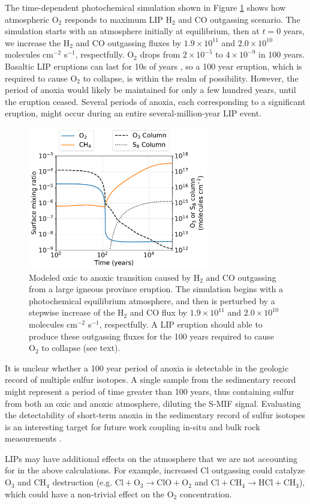 The time-dependent photochemical simulation shown in Figure \ref{fig:volc} shows how atmospheric O$_2$ responds to maximum LIP H$_2$ and CO outgassing scenario. The simulation starts with an atmosphere initially at equilibrium, then at $t = 0$ years, we increase the H$_2$ and CO outgassing fluxes by $1.9 \times 10^{11}$ and $2.0 \times 10^{10}$ molecules cm$^{-2}$ s$^{-1}$, respectfully. O$_2$ drops from $2 \times 10^{-5}$ to $4 \times 10^{-9}$ in 100 years. Basaltic LIP eruptions can last for 10s of years \citep{Bryan_2010}, so a 100 year eruption, which is required to cause O$_2$ to collapse, is within the realm of possibility. However, the period of anoxia would likely be maintained for only a few hundred years, until the eruption ceased. Several periods of anoxia, each corresponding to a significant eruption, might occur during an entire several-million-year LIP event.

\begin{figure}
  \centering
  \includegraphics[width=0.7\textwidth]{tex/4goe/supplement/figures/Volcanism.pdf}
  \caption{Modeled oxic to anoxic transition caused by H$_2$ and CO outgassing from a large igneous province eruption. The simulation begins with a photochemical equilibrium atmosphere, and then is perturbed by a stepwise increase of the H$_2$ and CO flux by $1.9 \times 10^{11}$ and $2.0 \times 10^{10}$ molecules cm$^{-2}$ s$^{-1}$, respectfully. A LIP eruption should able to produce these outgassing fluxes for the 100 years required to cause O$_2$ to collapse (see text).}
  \label{fig:volc}
\end{figure}

It is unclear whether a 100 year period of anoxia is detectable in the geologic record of multiple sulfur isotopes. A single sample from the sedimentary record might represent a period of time greater than 100 years, thus containing sulfur from both an oxic and anoxic atmosphere, diluting the S-MIF signal. Evaluating the detectability of short-term anoxia in the sedimentary record of sulfur isotopes is an interesting target for future work coupling in-situ and bulk rock measurements \citep{Meyer_2017}.

LIPs may have additional effects on the atmosphere that we are not accounting for in the above calculations. For example, increased Cl outgassing could catalyze O$_3$ and CH$_4$ destruction (e.g. $\mathrm{Cl} + \mathrm{O_3} \rightarrow \mathrm{ClO} + \mathrm{O_2}$ and $\mathrm{Cl} + \mathrm{CH_4} \rightarrow \mathrm{HCl} + \mathrm{CH_3}$), which could have a non-trivial effect on the O$_2$ concentration.